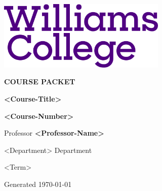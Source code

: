 \documentclass[12pt]{article}
\begin{document}
\begin{center}

\vspace{0.75in}
\includegraphics[height=1.3in]{williams-logo.png}

\vspace{0.6in}

{\color{williamspurple} \fontsize{16}{20}\selectfont \textbf{COURSE PACKET}}

\vspace{0.4in}

{\color{williamsblue} \fontsize{26}{32}\selectfont \textbf{<Course-Title>}}

\vspace{0.6in}

{\fontsize{20}{24}\selectfont \textbf{<Course-Number>}}

\vspace{0.5in}

{\fontsize{16}{20}\selectfont Professor \textbf{<Professor-Name>}}

\vspace{0.3in}

{\color{williamspurple} \fontsize{14}{18}\selectfont <Department> Department}

\vspace{0.25in}

{\color{accentgray} \fontsize{14}{18}\selectfont <Term>}

\vfill

{\color{accentgray} \fontsize{9}{11}\selectfont 
Generated \today}

\vspace{0.5in}

\end{center}
\end{document}

